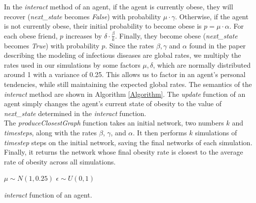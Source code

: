 \documentclass[11pt]{article}
\begin{document}
In the \textit{interact} method of an agent, if the agent is currently obese, they will recover (\textit{next\_state} becomes \textit{False}) with probability \(\mu \cdot \gamma\). 
Otherwise, if the agent is not currently obese, their initial probability to become obese is \(p = \mu \cdot \alpha\). 
For each obese friend, \(p\) increases by \(\delta \cdot \frac{\beta}{k}\). 
Finally, they become obese (\textit{next\_state} becomes \textit{True}) with probability \(p\). Since the rates \(\beta, \gamma\) and \(\alpha\) found in the paper describing the modeling of infectious diseases\cite{infectiousDiseaseModeling} are global rates, we multiply the rates used in our simulations by some factors \(\mu, \delta\), which are normally distributed around 1 with a variance of 0.25. This allows us to factor in an agent's personal tendencies, while still maintaining the expected global rates. The semantics of the \textit{interact} method are shown in Algorithm \ref{Algorithm}. The \textit{update} function of an agent simply changes the agent's current state of obesity to the value of \textit{next\_state} determined in the \textit{interact} function. \\

The \textit{produceClosestGraph} function takes an initial network, two numbers \(k\) and \textit{timesteps}, along with the rates \(\beta\), \(\gamma\), and \(\alpha\). It then performs \(k\) simulations of \textit{timestep} steps on the initial network, saving the final networks of each simulation. Finally, it returns the network whose final obesity rate is closest to the average rate of obesity across all simulations. \\

\begin{algorithm}[H]
    \(\mu \sim N(1, 0.25)\)\;
    \(\epsilon \sim U(0, 1)\)\;
    \caption{{\textit{interact} function of an agent. \label{Algorithm}}}
\end{algorithm}
\end{document}
